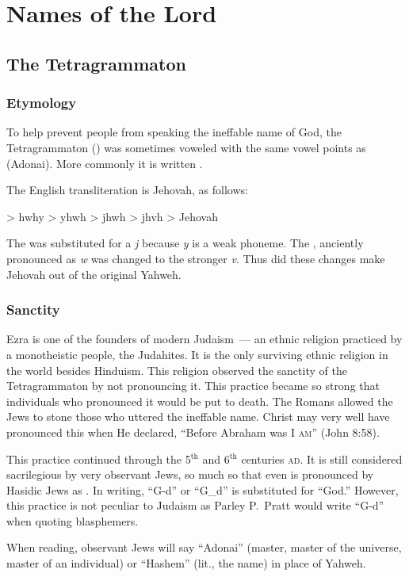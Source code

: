 \chapter{Names of the Lord}\label{app:names-of-the-lord}
\section{The Tetragrammaton}
\subsection{Etymology}
To help prevent people from speaking the ineffable name of God, the Tetragrammaton () was sometimes voweled with the same vowel points as  (Adonai). More commonly it is written .

The English transliteration is Jehovah, as follows:
\begin{center}
     > hwhy > yhwh > jhwh > jhvh > Jehovah
\end{center}
The  was substituted for a \emph{j} because \emph{y} is a weak phoneme. The , anciently pronounced as \emph{w} was changed to the stronger \emph{v}. Thus did these changes make Jehovah out of the original Yahweh.

\subsection{Sanctity}
Ezra is one of the founders of modern Judaism~--- an ethnic religion practiced by a monotheistic people, the Judahites. It is the only surviving ethnic religion in the world besides Hinduism. This religion observed the sanctity of the Tetragrammaton by not pronouncing it. This practice became so strong that individuals who pronounced it would be put to death. The Romans allowed the Jews to stone those who uttered the ineffable name. Christ may very well have pronounced this when He declared, ``Before Abraham was \textsc{I am}'' (John 8:58).

This practice continued through the 5$^\text{th}$ and 6$^\text{th}$ centuries \textsc{ad}. It is still considered sacrilegious by very observant Jews, so much so that even  is pronounced by Hasidic Jews as . In writing, ``G-d'' or ``G\_{}d'' is substituted for ``God.'' However, this practice is not peculiar to Judaism as Parley P.\ Pratt would write ``G-d'' when quoting blasphemers.

When reading, observant Jews will say ``Adonai'' (master, master of the universe, master of an individual) or ``Hashem'' (lit., the name) in place of Yahweh.

